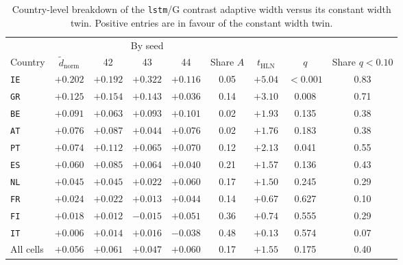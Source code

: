 \begin{table}[t]
\centering
\caption{Country-level breakdown of the \texttt{lstm}/G contrast
         adaptive width versus its constant width twin. Positive entries
         are in favour of the constant width twin.}
\label{tab:res_rq2_lstmG}
\small
\begin{tabular}{lcccccccc}
\toprule
 & & \multicolumn{3}{c}{By seed} & & & & \\
\cmidrule(lr){3-5}
Country & $\tilde d_{\mathrm{norm}}$ & 42 & 43 & 44 & Share $A$ & $t_{\mathrm{HLN}}$ & $q$ & Share $q<0.10$ \\
\midrule
\texttt{IE} & $+0.202$ & $+0.192$ & $+0.322$ & $+0.116$ & 0.05 & $+5.04$ & $<0.001$ & 0.83 \\
\texttt{GR} & $+0.125$ & $+0.154$ & $+0.143$ & $+0.036$ & 0.14 & $+3.10$ & 0.008 & 0.71 \\
\texttt{BE} & $+0.091$ & $+0.063$ & $+0.093$ & $+0.101$ & 0.02 & $+1.93$ & 0.135 & 0.38 \\
\texttt{AT} & $+0.076$ & $+0.087$ & $+0.044$ & $+0.076$ & 0.02 & $+1.76$ & 0.183 & 0.38 \\
\texttt{PT} & $+0.074$ & $+0.112$ & $+0.065$ & $+0.070$ & 0.12 & $+2.13$ & 0.041 & 0.55 \\
\texttt{ES} & $+0.060$ & $+0.085$ & $+0.064$ & $+0.040$ & 0.21 & $+1.57$ & 0.136 & 0.43 \\
\texttt{NL} & $+0.045$ & $+0.045$ & $+0.022$ & $+0.060$ & 0.17 & $+1.50$ & 0.245 & 0.29 \\
\texttt{FR} & $+0.024$ & $+0.022$ & $+0.013$ & $+0.044$ & 0.14 & $+0.67$ & 0.627 & 0.10 \\
\texttt{FI} & $+0.018$ & $+0.012$ & $-0.015$ & $+0.051$ & 0.36 & $+0.74$ & 0.555 & 0.29 \\
\texttt{IT} & $+0.006$ & $+0.014$ & $+0.016$ & $-0.038$ & 0.48 & $+0.13$ & 0.574 & 0.07 \\
\midrule
All cells & $+0.056$ & $+0.061$ & $+0.047$ & $+0.060$ & 0.17 & $+1.55$ & 0.175 & 0.40 \\
\bottomrule
\end{tabular}


\end{table}
